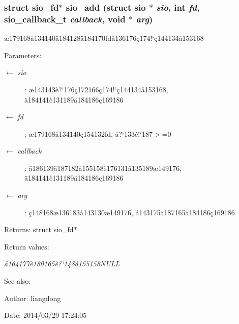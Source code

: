 \subsubsection{\setlength{\rightskip}{0pt plus 5cm}struct sio\_\-fd$\ast$ sio\_\-add (struct sio $\ast$ {\em sio}, int {\em fd}, sio\_\-callback\_\-t {\em callback}, void $\ast$ {\em arg})}\label{sio_8h_a6}


\ae{}179168\aa{}134140\"{a}184128\"{a}184170fd\aa{}136176\c{c}174!`\c{c}144134\aa{}153168 

\begin{Desc}
\item[Parameters:]
\begin{description}
\item[\mbox{$\leftarrow$} {\em sio}]: \ae{}143143\`{e}?`176\c{c}172166\c{c}174!`\c{c}144134\aa{}153168, \"{a}184141\`{e}131189\"{a}184186\c{c}169186 \item[\mbox{$\leftarrow$} {\em fd}]: \ae{}179168\aa{}134140\c{c}154132fd, \aa{}?`133\'{e}!`187$>$=0 \item[\mbox{$\leftarrow$} {\em callback}]: \"{a}186139\"{a}187182\aa{}155158\`{e}176131\aa{}135189\ae{}149176, \"{a}184141\`{e}131189\"{a}184186\c{c}169186 \item[\mbox{$\leftarrow$} {\em arg}]: \c{c}148168\ae{}136183\aa{}143130\ae{}149176, \aa{}143175\"{a}187165\"{a}184186\c{c}169186 \end{description}
\end{Desc}
\begin{Desc}
\item[Returns:]struct sio\_\-fd$\ast$ \end{Desc}
\begin{Desc}
\item[Return values:]
\begin{description}
\item[{\em \aa{}164177\`{e}180165\`{e}?`148\aa{}155158NULL}]\end{description}
\end{Desc}
\begin{Desc}
\item[See also:]\end{Desc}
\begin{Desc}
\item[Author:]liangdong \end{Desc}
\begin{Desc}
\item[Date:]2014/03/29 17:24:05 \end{Desc}
